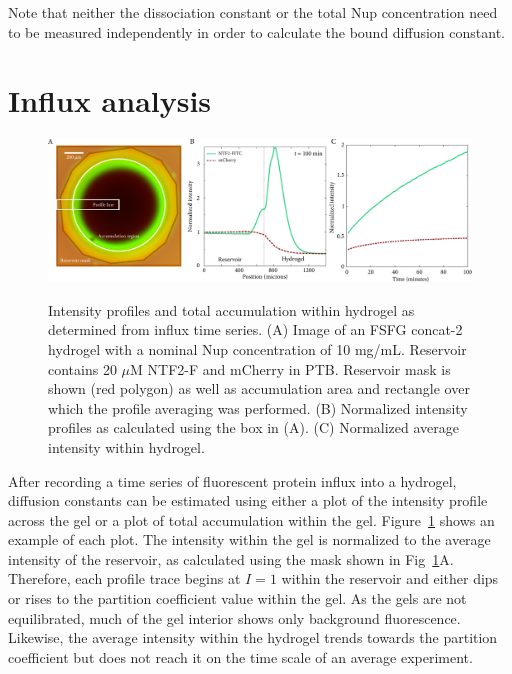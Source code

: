 Note that neither the dissociation constant or the total Nup concentration need to be measured independently in order to calculate the bound diffusion constant.

\section{Influx analysis}
\label{sec:influx-analysis}

\begin{figure}
\caption{Intensity profiles and total accumulation within hydrogel as determined from influx time series.  (A) Image of an FSFG concat-2 hydrogel with a nominal Nup concentration of 10 mg/mL. Reservoir contains 20 $\mu$M NTF2-F and mCherry in PTB. Reservoir mask is shown (red polygon) as well as accumulation area and rectangle over which the profile averaging was performed. (B) Normalized intensity profiles as calculated using the box in (A).  (C) Normalized average intensity within hydrogel.}
\centering
\includegraphics[width=\textwidth]{figs/ch04/influx-plots.pdf}
\label{fig:influx-plots}
\end{figure}

After recording a time series of fluorescent protein influx into a hydrogel, diffusion constants can be estimated using either a plot of the intensity profile across the gel or a plot of total accumulation within the gel.  Figure~\ref{fig:influx-plots} shows an example of each plot.  The intensity within the gel is normalized to the average intensity of the reservoir, as calculated using the mask shown in Fig~\ref{fig:influx-plots}A.  Therefore, each profile trace begins at $I=1$ within the reservoir and either dips or rises to the partition coefficient value within the gel.  As the gels are not equilibrated, much of the gel interior shows only background fluorescence.  Likewise, the average intensity within the hydrogel trends towards the partition coefficient but does not reach it on the time scale of an average experiment.

